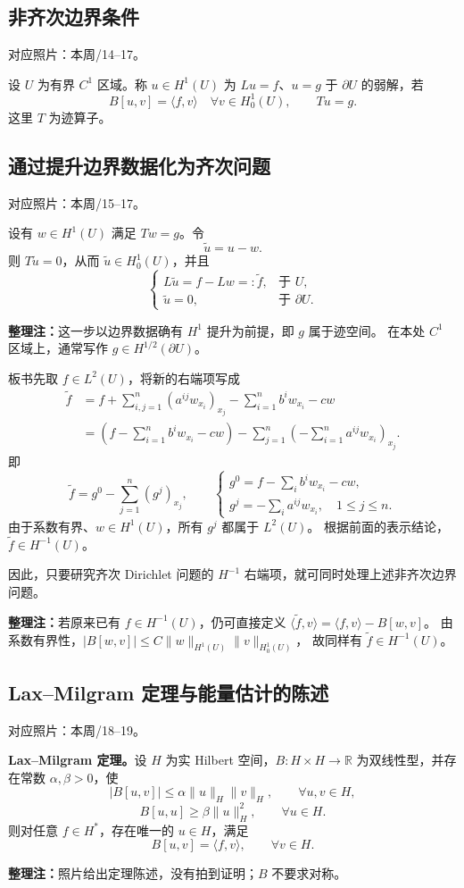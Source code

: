 \documentclass[UTF8,a4paper,11pt,fontset=fandol]{ctexart}
\newcommand{\R}{\mathbb R}
\newcommand{\ednote}[1]{\par{\small\color{notegray}\textbf{整理注：}#1}\par}
\newcommand{\source}[1]{{\small\color{notegray}对应照片：#1。}\par}
\begin{document}
\subsection*{非齐次边界条件}
\source{本周/14--17}
设 $U$ 为有界 $C^1$ 区域。称 $u\in H^1(U)$ 为
$Lu=f$、$u=g$ 于 $\partial U$ 的弱解，若
\[
B[u,v]=\langle f,v\rangle\quad\forall v\in H_0^1(U),\qquad Tu=g.
\]
这里 $T$ 为迹算子。

\newpage
\subsection{通过提升边界数据化为齐次问题}
\source{本周/15--17}
设有 $w\in H^1(U)$ 满足 $Tw=g$。令
\[
\widetilde u=u-w.
\]
则 $T\widetilde u=0$，从而 $\widetilde u\in H_0^1(U)$，并且
\[
\begin{cases}
L\widetilde u=f-Lw=:\widetilde f,&\text{于 }U,\\
\widetilde u=0,&\text{于 }\partial U.
\end{cases}
\]
\ednote{这一步以边界数据确有 $H^1$ 提升为前提，即 $g$ 属于迹空间。
在本处 $C^1$ 区域上，通常写作 $g\in H^{1/2}(\partial U)$。}

板书先取 $f\in L^2(U)$，将新的右端项写成
\[
\begin{aligned}
\widetilde f
&=f+\sum_{i,j=1}^n(a^{ij}w_{x_i})_{x_j}
     -\sum_{i=1}^nb^iw_{x_i}-cw\\
&=\left(f-\sum_{i=1}^nb^iw_{x_i}-cw\right)
  -\sum_{j=1}^n\left(-\sum_{i=1}^na^{ij}w_{x_i}\right)_{x_j}.
\end{aligned}
\]
即
\[
\widetilde f=g^0-\sum_{j=1}^n(g^j)_{x_j},\qquad
\begin{cases}
g^0=f-\displaystyle\sum_i b^iw_{x_i}-cw,\\[3pt]
g^j=-\displaystyle\sum_i a^{ij}w_{x_i},\quad 1\leq j\leq n.
\end{cases}
\]
由于系数有界、$w\in H^1(U)$，所有 $g^j$ 都属于 $L^2(U)$。
根据前面的表示结论，$\widetilde f\in H^{-1}(U)$。

因此，只要研究齐次 Dirichlet 问题的 $H^{-1}$ 右端项，就可同时处理上述非齐次边界问题。
\ednote{若原来已有 $f\in H^{-1}(U)$，仍可直接定义
$\langle\widetilde f,v\rangle=\langle f,v\rangle-B[w,v]$。
由系数有界性，$|B[w,v]|\leq C\|w\|_{H^1(U)}\|v\|_{H_0^1(U)}$，
故同样有 $\widetilde f\in H^{-1}(U)$。}

\newpage
\subsection{Lax--Milgram 定理与能量估计的陈述}
\source{本周/18--19}
\textbf{Lax--Milgram 定理。}设 $H$ 为实 Hilbert 空间，$B:H\times H\to\R$
为双线性型，并存在常数 $\alpha,\beta>0$，使
\[
|B[u,v]|\leq\alpha\|u\|_H\|v\|_H,\qquad\forall u,v\in H,
\]
\[
B[u,u]\geq\beta\|u\|_H^2,\qquad\forall u\in H.
\]
则对任意 $f\in H^*$，存在唯一的 $u\in H$，满足
\[
\boxed{B[u,v]=\langle f,v\rangle,\qquad\forall v\in H.}
\]
\ednote{照片给出定理陈述，没有拍到证明；$B$ 不要求对称。}
\end{document}
